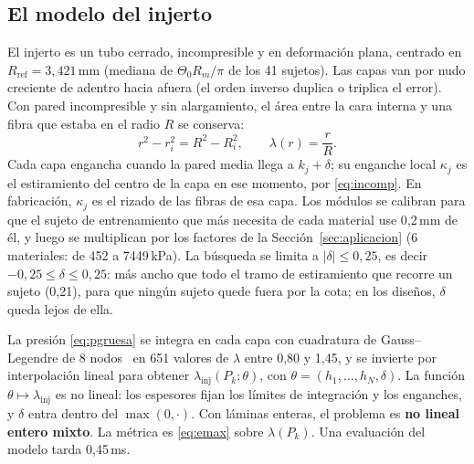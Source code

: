 \subsection{El modelo del injerto}
El injerto es un tubo cerrado, incompresible y en deformación plana, centrado en $R_{\mathrm{ref}}=3{,}421$\,mm (mediana de $\Theta_0R_m/\pi$ de los 41 sujetos). Las capas van por nudo creciente de adentro hacia afuera (el orden inverso duplica o triplica el error). Con pared incompresible y sin alargamiento, el área entre la cara interna y una fibra que estaba en el radio $R$ se conserva:
\begin{equation}\label{eq:incomp}
r^2-r_i^2=R^2-R_i^2,\qquad\lambda(r)=\frac{r}{R}.
\end{equation}
Cada capa engancha cuando la pared media llega a $k_j+\delta$; su enganche local $\kappa_j$ es el estiramiento del centro de la capa en ese momento, por \eqref{eq:incomp}. En fabricación, $\kappa_j$ es el rizado de las fibras de esa capa. Los módulos se calibran para que el sujeto de entrenamiento que más necesita de cada material use 0,2\,mm de él, y luego se multiplican por los factores de la Sección~\ref{sec:aplicacion} (6 materiales: de 452 a 7449\,kPa). La búsqueda se limita a $|\delta|\le0{,}25$, es decir $-0{,}25\le\delta\le0{,}25$: más ancho que todo el tramo de estiramiento que recorre un sujeto (0,21), para que ningún sujeto quede fuera por la cota; en los diseños, $\delta$ queda lejos de ella.

La presión \eqref{eq:pgruesa} se integra en cada capa con cuadratura de Gauss--Legendre de 8 nodos~\cite{davis} en 651 valores de $\lambda$ entre 0,80 y 1,45, y se invierte por interpolación lineal para obtener $\lambda_{\mathrm{inj}}(P_k;\theta)$, con $\theta=(h_1,\dots,h_N,\delta)$. La función $\theta\mapsto\lambda_{\mathrm{inj}}$ es no lineal: los espesores fijan los límites de integración y los enganches, y $\delta$ entra dentro del $\max(0,\cdot)$. Con láminas enteras, el problema es \textbf{no lineal entero mixto}. La métrica es \eqref{eq:emax} sobre $\lambda(P_k)$. Una evaluación del modelo tarda 0,45\,ms.

